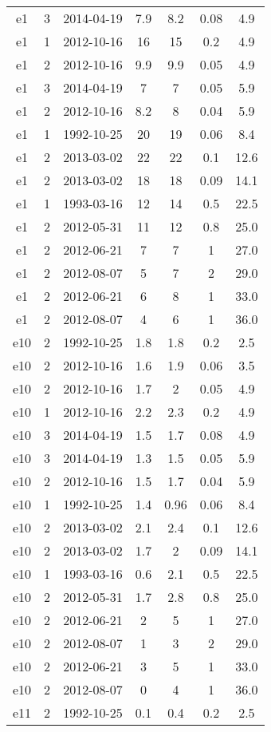 \begin{table*}[htp]
\begin{tabular}{ccccccc}
e1 & 3 & 2014-04-19 & 7.9 & 8.2 & 0.08 & 4.9 \\
e1 & 1 & 2012-10-16 & 16 & 15 & 0.2 & 4.9 \\
e1 & 2 & 2012-10-16 & 9.9 & 9.9 & 0.05 & 4.9 \\
e1 & 3 & 2014-04-19 & 7 & 7 & 0.05 & 5.9 \\
e1 & 2 & 2012-10-16 & 8.2 & 8 & 0.04 & 5.9 \\
e1 & 1 & 1992-10-25 & 20 & 19 & 0.06 & 8.4 \\
e1 & 2 & 2013-03-02 & 22 & 22 & 0.1 & 12.6 \\
e1 & 2 & 2013-03-02 & 18 & 18 & 0.09 & 14.1 \\
e1 & 1 & 1993-03-16 & 12 & 14 & 0.5 & 22.5 \\
e1 & 2 & 2012-05-31 & 11 & 12 & 0.8 & 25.0 \\
e1 & 2 & 2012-06-21 & 7 & 7 & 1 & 27.0 \\
e1 & 2 & 2012-08-07 & 5 & 7 & 2 & 29.0 \\
e1 & 2 & 2012-06-21 & 6 & 8 & 1 & 33.0 \\
e1 & 2 & 2012-08-07 & 4 & 6 & 1 & 36.0 \\
e10 & 2 & 1992-10-25 & 1.8 & 1.8 & 0.2 & 2.5 \\
e10 & 2 & 2012-10-16 & 1.6 & 1.9 & 0.06 & 3.5 \\
e10 & 2 & 2012-10-16 & 1.7 & 2 & 0.05 & 4.9 \\
e10 & 1 & 2012-10-16 & 2.2 & 2.3 & 0.2 & 4.9 \\
e10 & 3 & 2014-04-19 & 1.5 & 1.7 & 0.08 & 4.9 \\
e10 & 3 & 2014-04-19 & 1.3 & 1.5 & 0.05 & 5.9 \\
e10 & 2 & 2012-10-16 & 1.5 & 1.7 & 0.04 & 5.9 \\
e10 & 1 & 1992-10-25 & 1.4 & 0.96 & 0.06 & 8.4 \\
e10 & 2 & 2013-03-02 & 2.1 & 2.4 & 0.1 & 12.6 \\
e10 & 2 & 2013-03-02 & 1.7 & 2 & 0.09 & 14.1 \\
e10 & 1 & 1993-03-16 & 0.6 & 2.1 & 0.5 & 22.5 \\
e10 & 2 & 2012-05-31 & 1.7 & 2.8 & 0.8 & 25.0 \\
e10 & 2 & 2012-06-21 & 2 & 5 & 1 & 27.0 \\
e10 & 2 & 2012-08-07 & 1 & 3 & 2 & 29.0 \\
e10 & 2 & 2012-06-21 & 3 & 5 & 1 & 33.0 \\
e10 & 2 & 2012-08-07 & 0 & 4 & 1 & 36.0 \\
e11 & 2 & 1992-10-25 & 0.1 & 0.4 & 0.2 & 2.5 \\

\end{tabular}
\end{table*}
